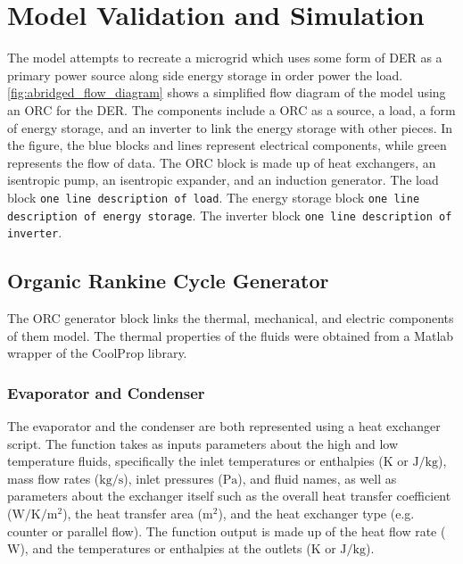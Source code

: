 \chapter{Model Validation and Simulation}
\label{ch:model}

The model attempts to recreate a microgrid which uses some form of DER as a primary power source along side energy storage in order power the load. \autoref{fig:abridged_flow_diagram} shows a simplified flow diagram of the model using an ORC for the DER. The components include a ORC as a source, a load, a form of energy storage, and an inverter to link the energy storage with other pieces. In the figure, the blue blocks and lines represent electrical components, while green represents the flow of data. The ORC block is made up of heat exchangers, an isentropic pump, an isentropic expander, and an induction generator. 
The load block \verb|one line description of load|. 
The energy storage block \verb|one line description of energy storage|. 
The inverter block \verb|one line description of inverter|.



\section{Organic Rankine Cycle Generator}
The ORC generator block links the thermal, mechanical, and electric components of them model. The thermal properties of the fluids were obtained from a Matlab wrapper of the CoolProp library. \cite{Bell2014}

\subsection{Evaporator and Condenser}
The evaporator and the condenser are both represented using a heat exchanger script.  The function takes as inputs parameters about the high and low temperature fluids, specifically the inlet temperatures or enthalpies ($\si{\kelvin}$ or $\si{\joule\per\kilogram}$), mass flow rates ($\si{\kilogram\per\second} $), inlet pressures ($\si{\pascal}$), and fluid names, as well as parameters about the exchanger itself such as the overall heat transfer coefficient ($\si{\watt\per\kelvin\per\meter\squared}$), the heat transfer area ($\si{\meter\squared}$), and the heat exchanger type (e.g. counter or parallel flow). The function output is made up of the heat flow rate ($\si{\watt}$), and the temperatures or enthalpies at the outlets ($\si{\kelvin}$ or $\si{\joule\per\kilogram}$). 

